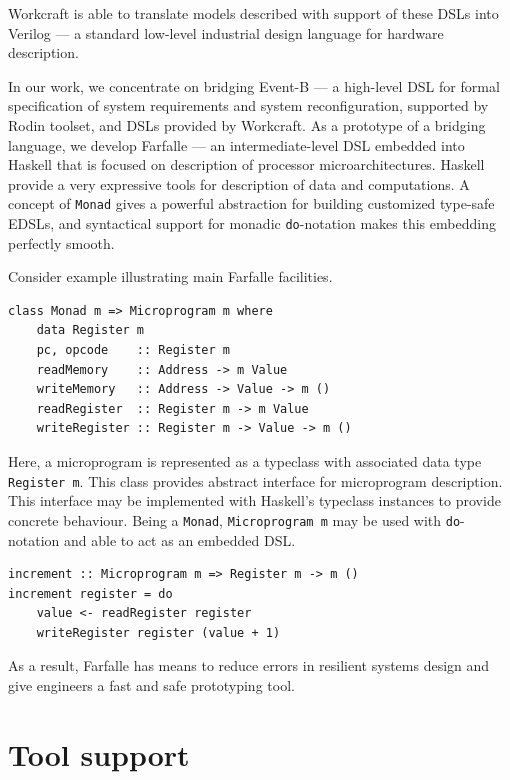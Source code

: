 \documentclass[conference]{IEEEtran}
\begin{document}
Workcraft is able to translate models described with support of these DSLs into
Verilog --- a standard low-level industrial design language for hardware
description.

In our work, we concentrate on bridging Event-B --- a high-level DSL
for formal specification of system requirements and system reconfiguration,
supported by Rodin toolset, and DSLs provided by Workcraft. As a
prototype of a bridging language, we develop Farfalle ---
an intermediate-level DSL embedded into Haskell that
is focused on description of processor microarchitectures.
Haskell provide a very expressive tools for description of data and
computations. A concept of \texttt{Monad} gives a powerful abstraction for
building customized type-safe EDSLs, and syntactical support for monadic
\texttt{do}-notation makes this embedding perfectly smooth.

Consider example illustrating main Farfalle facilities.

\begin{verbatim}
class Monad m => Microprogram m where
    data Register m
    pc, opcode    :: Register m
    readMemory    :: Address -> m Value
    writeMemory   :: Address -> Value -> m ()
    readRegister  :: Register m -> m Value
    writeRegister :: Register m -> Value -> m ()
\end{verbatim}

Here, a microprogram is represented as a typeclass with associated
data type \texttt{Register m}. This class provides abstract interface for
microprogram description. This interface may be
implemented with Haskell's typeclass instances to provide concrete behaviour.
Being a \texttt{Monad}, \texttt{Microprogram m} may be used with
\texttt{do}-notation and able to act as an embedded DSL.

\begin{verbatim}
increment :: Microprogram m => Register m -> m ()
increment register = do
    value <- readRegister register
    writeRegister register (value + 1)
\end{verbatim}

As a result, Farfalle has means to reduce errors in resilient systems design
and give engineers a fast and safe prototyping tool.

\section{Tool support}
\end{document}
